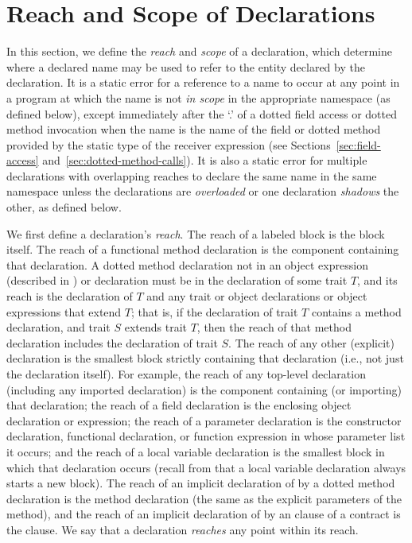 \section{Reach and Scope of Declarations}

In this section,
we define the \emph{reach} and \emph{scope} of a declaration,
which determine where a declared name may be used to refer to the entity
declared by the declaration.  
It is a static error 
for a reference to a name to occur at any point in a program
at which the name is not \emph{in scope} in the appropriate namespace
(as defined below),
except immediately after the `.'
of a dotted field access or dotted method invocation
when the name is the name of the field or dotted method
provided by the static type of the receiver expression
(see Sections~\ref{sec:field-access}
and~\ref{sec:dotted-method-calls}).
It is also a static error 
for multiple declarations with overlapping reaches 
to declare the same name in the same namespace 
unless the declarations are \emph{overloaded} 
or one declaration \emph{shadows} the other, 
as defined below.

We first define a declaration's \emph{reach}.
The reach of a labeled block is the block itself.
The reach of a functional method declaration
is the component containing that declaration.
A dotted method declaration not in an object expression
(described in ) or declaration
must be in the declaration of some trait $T$,
and its reach is the declaration of $T$
and any trait or object declarations
or object expressions
that extend $T$;
that is,
if the declaration of trait $T$
contains a method declaration,
and trait $S$ extends trait $T$,
then the reach of that method declaration
includes the declaration of trait $S$.
The reach of any other (explicit) declaration
is the smallest block strictly containing that declaration
(i.e., not just the declaration itself).
For example,
the reach of any top-level declaration
(including any imported declaration)
is the component containing (or importing) that declaration;
the reach of a field declaration
is the enclosing object declaration or expression;
the reach of a parameter declaration
is the constructor declaration, functional declaration,
or function expression in whose parameter list it occurs;
and the reach of a local variable declaration
is the smallest block in which that declaration occurs
(recall from 
that a local variable declaration always starts a new block).
The reach of an implicit declaration of 
by a dotted method declaration
is the method declaration
(the same as the explicit parameters of the method),
and the reach of an implicit declaration of 
by an  clause of a contract 
is the  clause.
We say that a declaration \emph{reaches}
any point within its reach.

